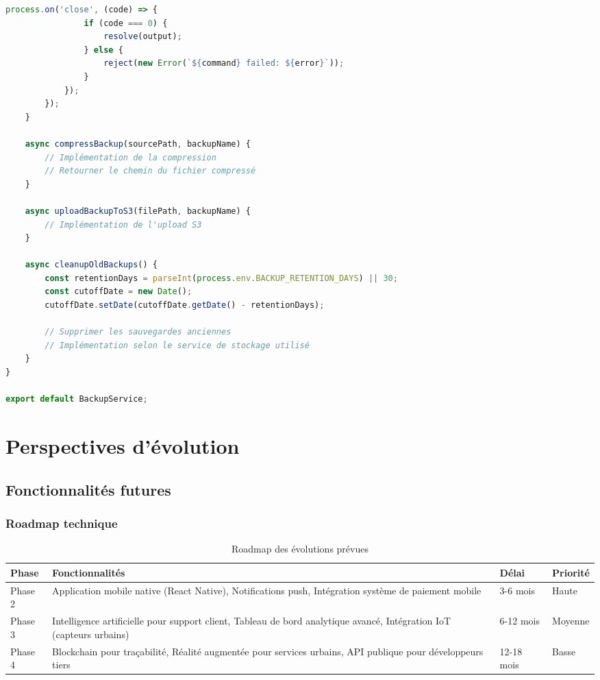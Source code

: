 \begin{lstlisting}[language=JavaScript, caption=backup-script.js]
            process.on('close', (code) => {
                if (code === 0) {
                    resolve(output);
                } else {
                    reject(new Error(`${command} failed: ${error}`));
                }
            });
        });
    }

    async compressBackup(sourcePath, backupName) {
        // Implémentation de la compression
        // Retourner le chemin du fichier compressé
    }

    async uploadBackupToS3(filePath, backupName) {
        // Implémentation de l'upload S3
    }

    async cleanupOldBackups() {
        const retentionDays = parseInt(process.env.BACKUP_RETENTION_DAYS) || 30;
        const cutoffDate = new Date();
        cutoffDate.setDate(cutoffDate.getDate() - retentionDays);
        
        // Supprimer les sauvegardes anciennes
        // Implémentation selon le service de stockage utilisé
    }
}

export default BackupService;
\end{lstlisting}

\section{Perspectives d'évolution}

\subsection{Fonctionnalités futures}

\subsubsection{Roadmap technique}

\begin{table}[H]
\centering
\caption{Roadmap des évolutions prévues}
\begin{tabular}{|l|p{5cm}|p{3cm}|p{3cm}|}
\hline
\textbf{Phase} & \textbf{Fonctionnalités} & \textbf{Délai} & \textbf{Priorité} \\
\hline
Phase 2 & 
Application mobile native (React Native), 
Notifications push,
Intégration système de paiement mobile & 
3-6 mois & Haute \\
\hline
Phase 3 & 
Intelligence artificielle pour support client,
Tableau de bord analytique avancé,
Intégration IoT (capteurs urbains) & 
6-12 mois & Moyenne \\
\hline
Phase 4 & 
Blockchain pour traçabilité,
Réalité augmentée pour services urbains,
API publique pour développeurs tiers & 
12-18 mois & Basse \\
\hline
\end{tabular}
\end{table}

